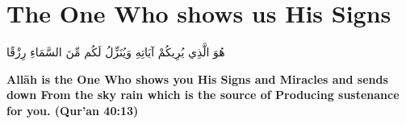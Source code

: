 \chapter{The One Who shows us His Signs}
\begin{center}
    {\Huge    
        \begin{Arabic}
            هُوَ الَّذِي يُرِيكُمْ آيَاتِهِ وَيُنَزِّلُ لَكُم مِّنَ السَّمَاءِ رِزْقًا
        \end{Arabic}
    }
\end{center}
\vspace*{\fill}
\vspace{3cm}
\begin{center}
    \large \textbf{Allāh is the One Who shows you His Signs and Miracles and sends down From the sky rain which is the source of Producing sustenance for you. (Qur'an 40:13)}
\end{center}
